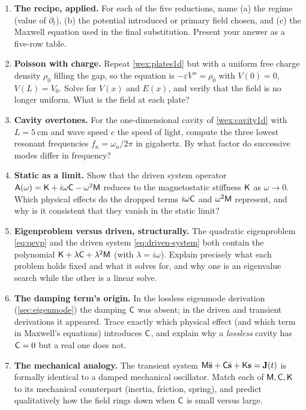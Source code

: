 \exercisessection
\begin{enumerate}[nosep]
  \item \textbf{The recipe, applied.} For each of the five reductions, name (a)
  the regime (value of $\partial_t$), (b) the potential introduced or primary
  field chosen, and (c) the Maxwell equation used in the final substitution.
  Present your answer as a five-row table.

  \item \textbf{Poisson with charge.} Repeat \cref{wex:plates1d} but with a
  uniform free charge density $\rho_0$ filling the gap, so the equation is
  $-\varepsilon V''=\rho_0$ with $V(0)=0$, $V(L)=V_0$. Solve for $V(x)$ and
  $E(x)$, and verify that the field is no longer uniform. What is the
  field at each plate?

  \item \textbf{Cavity overtones.} For the one-dimensional cavity of
  \cref{wex:cavity1d} with $L=\SI{5}{\centi\meter}$ and wave speed $c$ the speed
  of light, compute the three lowest resonant frequencies $f_n=\omega_n/2\pi$ in
  gigahertz. By what factor do successive modes differ in frequency?

  \item \textbf{Static as a limit.} Show that the driven system operator
  $\mathsf{A}(\omega)=\mathsf{K}+i\omega\mathsf{C}-\omega^2\mathsf{M}$ reduces to the magnetostatic
  stiffness $\mathsf{K}$ as $\omega\to 0$. Which physical effects do the dropped terms
  $i\omega\mathsf{C}$ and $\omega^2\mathsf{M}$ represent, and why is it consistent that they
  vanish in the static limit?

  \item \textbf{Eigenproblem versus driven, structurally.} The quadratic
  eigenproblem \cref{eq:qevp} and the driven system \cref{eq:driven-system} both
  contain the polynomial $\mathsf{K}+\lambda\mathsf{C}+\lambda^2\mathsf{M}$ (with
  $\lambda=i\omega$). Explain precisely what each problem holds fixed and what it
  solves for, and why one is an eigenvalue search while the other is a linear
  solve.

  \item \textbf{The damping term's origin.} In the lossless eigenmode derivation
  (\cref{sec:eigenmode}) the damping $\mathsf{C}$ was absent; in the driven and
  transient derivations it appeared. Trace exactly which physical effect (and
  which term in Maxwell's equations) introduces $\mathsf{C}$, and explain why a
  \emph{lossless} cavity has $\mathsf{C}=0$ but a real one does not.

  \item \textbf{The mechanical analogy.} The transient system
  $\mathsf{M}\ddot{\mathbf{s}}+\mathsf{C}\dot{\mathbf{s}}+\mathsf{K}\mathbf{s}=\mathbf{J}(t)$ is formally identical to a damped
  mechanical oscillator. Match each of $\mathsf{M},\mathsf{C},\mathsf{K}$ to its mechanical
  counterpart (inertia, friction, spring), and predict qualitatively how the
  field rings down when $\mathsf{C}$ is small versus large.


\end{enumerate}
